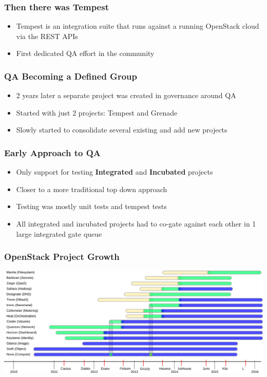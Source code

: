 \documentclass[aspectratio=43,11pt,hyperref={colorlinks=true}]{beamer}
\begin{document}
\begin{frame}
    \frametitle{Then there was Tempest}
    \begin{itemize}
        \item Tempest is an integration suite that runs against a running
            OpenStack cloud via the REST APIs
        \item First dedicated QA effort in the community
    \end{itemize}
\end{frame}

\begin{frame}
    \frametitle{QA Becoming a Defined Group}
    \begin{itemize}
        \item 2 years later a separate project was created in governance around QA
        \item Started with just 2 projects: Tempest and Grenade
        \item Slowly started to consolidate several existing and add new projects
    \end{itemize}
\end{frame}

\begin{frame}
    \frametitle{Early Approach to QA}
    \begin{itemize}
        \item Only support for testing \textbf{Integrated} and
              \textbf{Incubated} projects
        \item Closer to a more traditional top down approach
        \item Testing was mostly unit tests and tempest tests
        \item All integrated and incubated projects had to co-gate against
              each other in 1 large integrated gate queue
    \end{itemize}
\end{frame}

\begin{frame}
    \frametitle{OpenStack Project Growth}
    \begin{center}
        \includegraphics[width=1.1\textwidth]{OpenStack_Components.png}
    \end{center}
\end{frame}
\end{document}
